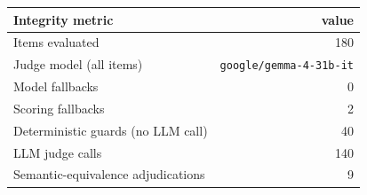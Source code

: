\begin{tabular}{@{}l r@{}}
\toprule
Integrity metric & value \\
\midrule
Items evaluated & 180 \\
Judge model (all items) & \texttt{google/gemma-4-31b-it} \\
Model fallbacks & 0 \\
Scoring fallbacks & 2 \\
Deterministic guards (no LLM call) & 40 \\
LLM judge calls & 140 \\
Semantic-equivalence adjudications & 9 \\
\bottomrule
\end{tabular}